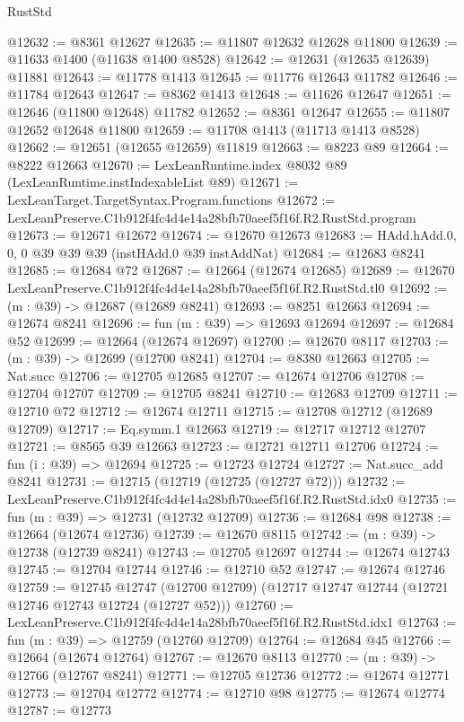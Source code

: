 \begin{lexlean}{RustStd}
\begin{coremodule}
@12632 := @8361 @12627
@12635 := @11807 @12632 @12628 @11800
@12639 := @11633 @1400 (@11638 @1400 @8528)
@12642 := @12631 (@12635 @12639) @11881
@12643 := @11778 @1413
@12645 := @11776 @12643 @11782
@12646 := @11784 @12643
@12647 := @8362 @1413
@12648 := @11626 @12647
@12651 := @12646 (@11800 @12648) @11782
@12652 := @8361 @12647
@12655 := @11807 @12652 @12648 @11800
@12659 := @11708 @1413 (@11713 @1413 @8528)
@12662 := @12651 (@12655 @12659) @11819
@12663 := @8223 @89
@12664 := @8222 @12663
@12670 := LexLeanRuntime.index @8032 @89 (LexLeanRuntime.instIndexableList @89)
@12671 := LexLeanTarget.TargetSyntax.Program.functions
@12672 := LexLeanPreserve.C1b912f4fc4d4e14a28bfb70aeef5f16f.R2.RustStd.program
@12673 := @12671 @12672
@12674 := @12670 @12673
@12683 := HAdd.hAdd.{0, 0, 0} @39 @39 @39 (instHAdd.{0} @39 instAddNat)
@12684 := @12683 @8241
@12685 := @12684 @72
@12687 := @12664 (@12674 @12685)
@12689 := @12670 LexLeanPreserve.C1b912f4fc4d4e14a28bfb70aeef5f16f.R2.RustStd.tl0
@12692 := (m : @39) -> @12687 (@12689 @8241)
@12693 := @8251 @12663
@12694 := @12674 @8241
@12696 := fun (m : @39) => @12693 @12694
@12697 := @12684 @52
@12699 := @12664 (@12674 @12697)
@12700 := @12670 @8117
@12703 := (m : @39) -> @12699 (@12700 @8241)
@12704 := @8380 @12663
@12705 := Nat.succ
@12706 := @12705 @12685
@12707 := @12674 @12706
@12708 := @12704 @12707
@12709 := @12705 @8241
@12710 := @12683 @12709
@12711 := @12710 @72
@12712 := @12674 @12711
@12715 := @12708 @12712 (@12689 @12709)
@12717 := Eq.symm.{1} @12663
@12719 := @12717 @12712 @12707
@12721 := @8565 @39 @12663
@12723 := @12721 @12711 @12706
@12724 := fun (i : @39) => @12694
@12725 := @12723 @12724
@12727 := Nat.succ_add @8241
@12731 := @12715 (@12719 (@12725 (@12727 @72)))
@12732 := LexLeanPreserve.C1b912f4fc4d4e14a28bfb70aeef5f16f.R2.RustStd.idx0
@12735 := fun (m : @39) => @12731 (@12732 @12709)
@12736 := @12684 @98
@12738 := @12664 (@12674 @12736)
@12739 := @12670 @8115
@12742 := (m : @39) -> @12738 (@12739 @8241)
@12743 := @12705 @12697
@12744 := @12674 @12743
@12745 := @12704 @12744
@12746 := @12710 @52
@12747 := @12674 @12746
@12759 := @12745
    @12747
    (@12700 @12709)
    (@12717 @12747 @12744 (@12721 @12746 @12743 @12724 (@12727 @52)))
@12760 := LexLeanPreserve.C1b912f4fc4d4e14a28bfb70aeef5f16f.R2.RustStd.idx1
@12763 := fun (m : @39) => @12759 (@12760 @12709)
@12764 := @12684 @45
@12766 := @12664 (@12674 @12764)
@12767 := @12670 @8113
@12770 := (m : @39) -> @12766 (@12767 @8241)
@12771 := @12705 @12736
@12772 := @12674 @12771
@12773 := @12704 @12772
@12774 := @12710 @98
@12775 := @12674 @12774
@12787 := @12773

\end{coremodule}
\end{lexlean}
